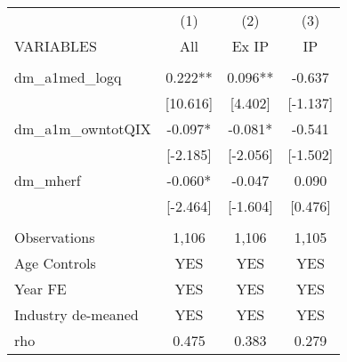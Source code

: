 \documentclass[]{article}
\begin{document}
\begin{tabular}{lccc} \hline
 & (1) & (2) & (3) \\
VARIABLES & All & Ex IP & IP \\ \hline
 &  &  &  \\
dm\_a1med\_logq & 0.222** & 0.096** & -0.637 \\
 & [10.616] & [4.402] & [-1.137] \\
dm\_a1m\_owntotQIX & -0.097* & -0.081* & -0.541 \\
 & [-2.185] & [-2.056] & [-1.502] \\
dm\_mherf & -0.060* & -0.047 & 0.090 \\
 & [-2.464] & [-1.604] & [0.476] \\
 &  &  &  \\
Observations & 1,106 & 1,106 & 1,105 \\
Age Controls & YES & YES & YES \\
Year FE & YES & YES & YES \\
Industry de-meaned & YES & YES & YES \\
 rho & 0.475 & 0.383 & 0.279 \\ \hline
\end{tabular}
\end{document}
